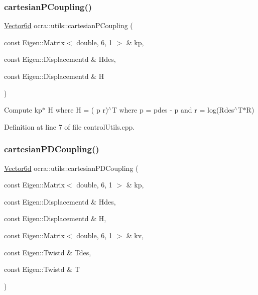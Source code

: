 \hypertarget{namespaceocra_1_1utils_aef5a7c74e8cfa9b803cd2a18d6401d1d}{}\label{namespaceocra_1_1utils_aef5a7c74e8cfa9b803cd2a18d6401d1d} 
\subsubsection{\texorpdfstring{cartesian\+P\+Coupling()}{cartesianPCoupling()}}
{\footnotesize\ttfamily \hyperlink{namespaceocra_a72fe7d6cf8411efbfc475a3a78209867}{Vector6d} ocra\+::utils\+::cartesian\+P\+Coupling (\begin{DoxyParamCaption}\item[{const Eigen\+::\+Matrix$<$ double, 6, 1 $>$ \&}]{kp,  }\item[{const Eigen\+::\+Displacementd \&}]{Hdes,  }\item[{const Eigen\+::\+Displacementd \&}]{H }\end{DoxyParamCaption})}

Compute kp$\ast$ H where  H = ( p  r)$^\wedge$T where  p = pdes -\/ p and  r = log(\+Rdes$^\wedge$\+T$\ast$\+R) 

Definition at line 7 of file control\+Utils.\+cpp.

\hypertarget{namespaceocra_1_1utils_a2253567d0df64a629bad3bdb7e2bd30b}{}\label{namespaceocra_1_1utils_a2253567d0df64a629bad3bdb7e2bd30b} 
\subsubsection{\texorpdfstring{cartesian\+P\+D\+Coupling()}{cartesianPDCoupling()}}
{\footnotesize\ttfamily \hyperlink{namespaceocra_a72fe7d6cf8411efbfc475a3a78209867}{Vector6d} ocra\+::utils\+::cartesian\+P\+D\+Coupling (\begin{DoxyParamCaption}\item[{const Eigen\+::\+Matrix$<$ double, 6, 1 $>$ \&}]{kp,  }\item[{const Eigen\+::\+Displacementd \&}]{Hdes,  }\item[{const Eigen\+::\+Displacementd \&}]{H,  }\item[{const Eigen\+::\+Matrix$<$ double, 6, 1 $>$ \&}]{kv,  }\item[{const Eigen\+::\+Twistd \&}]{Tdes,  }\item[{const Eigen\+::\+Twistd \&}]{T }\end{DoxyParamCaption})}

